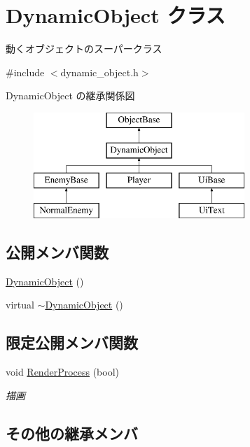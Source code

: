 \hypertarget{class_dynamic_object}{}\section{Dynamic\+Object クラス}
\label{class_dynamic_object}


動くオブジェクトのスーパークラス  




{\ttfamily \#include $<$dynamic\+\_\+object.\+h$>$}

Dynamic\+Object の継承関係図\begin{figure}[H]
\begin{center}
\leavevmode
\includegraphics[height=4.000000cm]{class_dynamic_object}
\end{center}
\end{figure}
\subsection*{公開メンバ関数}
\begin{DoxyCompactItemize}
\item 
\mbox{\hyperlink{class_dynamic_object_a50a7adf3d7d1f411ed2aa9a663bfe275}{Dynamic\+Object}} ()
\item 
virtual \mbox{\hyperlink{class_dynamic_object_af9141dddf35d338d5bae491cb0455583}{$\sim$\+Dynamic\+Object}} ()
\end{DoxyCompactItemize}
\subsection*{限定公開メンバ関数}
\begin{DoxyCompactItemize}
\item 
void \mbox{\hyperlink{class_dynamic_object_aa7488e1b4dfd7049447535d93d9d6783}{Render\+Process}} (bool)
\begin{DoxyCompactList}\small\item\em 描画 \end{DoxyCompactList}\end{DoxyCompactItemize}
\subsection*{その他の継承メンバ}


